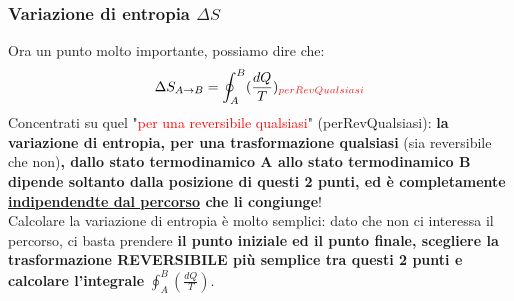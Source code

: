             \subsubsection{Variazione di entropia $\Delta S$}
                Ora un punto molto importante, possiamo dire che:
                \begin{align*}
                    \Delta S_{A\rightarrow B}=\oint_{A}^B(\frac{dQ}{T})_{\textcolor{Red}{perRevQualsiasi}}
                \end{align*}
                Concentrati su quel "\textcolor{Red}{per una reversibile qualsiasi}" (perRevQualsiasi): \textbf{la variazione di entropia, per una trasformazione qualsiasi} (sia reversibile che non)\textbf{, dallo stato termodinamico A allo stato termodinamico B dipende soltanto dalla posizione di questi 2 punti, ed è completamente \underline{indipendendte dal percorso} che li congiunge}!\bigskip\\
                Calcolare la variazione di entropia è molto semplici: dato che non ci interessa il percorso, ci basta prendere \textbf{il punto iniziale ed il punto finale, scegliere la trasformazione REVERSIBILE più semplice tra questi 2 punti e calcolare l'integrale} $\oint_{A}^B(\frac{dQ}{T})$.

